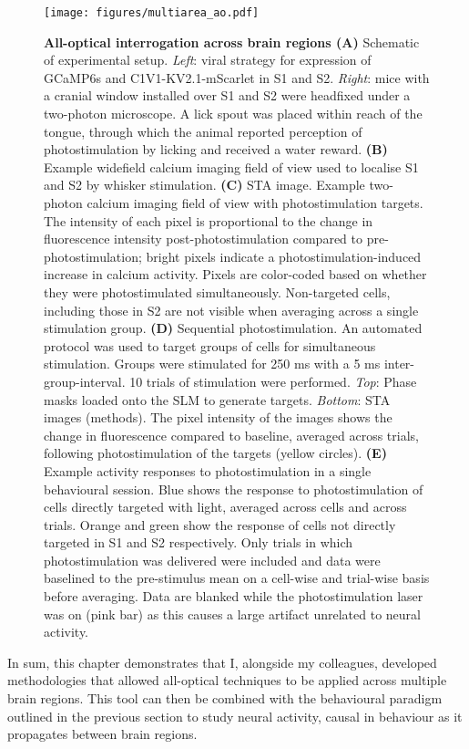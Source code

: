 \begin{figure}[h]
\hspace*{-0.4in}
\texttt{[image: figures/multiarea\_ao.pdf]}
\caption[\textbf{All-optical interrogation across brain regions}]{
\textbf{All-optical interrogation across brain regions (A)} Schematic of experimental setup. \textit{Left}: viral strategy for expression of GCaMP6s and C1V1-KV2.1-mScarlet in S1 and S2.  \textit{Right}: mice with a cranial window installed over S1 and S2 were headfixed under a two-photon microscope. A lick spout was placed within reach of the tongue, through which the animal reported perception of photostimulation by licking and received a water reward. \textbf{(B)} Example widefield calcium imaging field of view used to localise S1 and S2 by whisker stimulation. \textbf{(C)} STA image. Example two-photon calcium imaging field of view with photostimulation targets. The intensity of each pixel is proportional to the change in fluorescence intensity post-photostimulation compared to pre-photostimulation; bright pixels indicate a photostimulation-induced increase in calcium activity. Pixels are color-coded based on whether they were photostimulated simultaneously. Non-targeted cells, including those in S2 are not visible when averaging across a single stimulation group.
\textbf{(D)} Sequential photostimulation. An
automated protocol was used to target groups of cells for simultaneous stimulation. Groups
were stimulated for 250 ms with a 5 ms inter-group-interval. 10 trials of stimulation were
performed. \textit{Top}: Phase masks loaded onto the SLM to generate targets. \textit{Bottom}: STA images (methods). The pixel intensity of the images shows the change in fluorescence compared to baseline, averaged across trials, following photostimulation of the targets (yellow circles). \textbf{(E)} Example activity responses to photostimulation in a single behavioural session. Blue shows the response to photostimulation of cells directly targeted with light, averaged across cells and across trials. Orange and green show the response of cells not directly targeted in S1 and S2 respectively. Only trials in which photostimulation was delivered were included and data were baselined to the pre-stimulus mean on a cell-wise and trial-wise basis before averaging. Data are blanked while the photostimulation laser was on (pink bar) as this causes a large artifact unrelated to neural activity.
} 
\label{fig:s1s2}
\end{figure}

In sum, this chapter demonstrates that I, alongside my colleagues, developed methodologies that allowed all-optical techniques to be applied across multiple brain regions. This tool can then be combined with the behavioural paradigm outlined in the previous section to study neural activity, causal in behaviour as it propagates between brain regions.